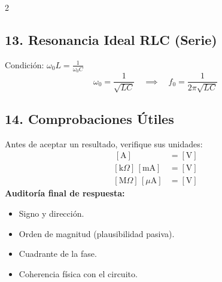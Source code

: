 \documentclass[10pt, a4paper]{article}
\begin{document}
\begin{multicols*}{2}
\subsection*{13. Resonancia Ideal RLC (Serie)}
Condición: $\omega_0 L = \frac{1}{\omega_0 C}$
\begin{equation*}
    \boxed{\omega_0 = \frac{1}{\sqrt{LC}}} \quad \implies \quad \boxed{f_0 = \frac{1}{2\pi\sqrt{LC}}}
\end{equation*}

\subsection*{14. Comprobaciones Útiles}
Antes de aceptar un resultado, verifique sus unidades:
\begin{align*}
    [\Omega] \, [\text{A}] &= [\text{V}] \\
    [\text{k}\Omega] \, [\text{mA}] &= [\text{V}] \\
    [\text{M}\Omega] \, [\mu\text{A}] &= [\text{V}]
\end{align*}
\textbf{Auditoría final de respuesta:}
\begin{itemize}[leftmargin=*, nosep]
    \item Signo y dirección.
    \item Orden de magnitud (plausibilidad pasiva).
    \item Cuadrante de la fase.
    \item Coherencia física con el circuito.
\end{itemize}

\end{multicols*}
\end{document}
